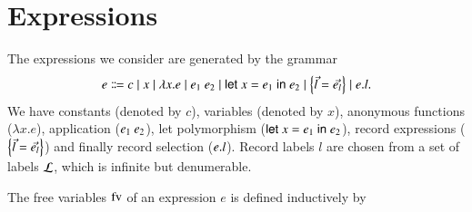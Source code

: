 \documentclass{report}
\begin{document}
  \section{Expressions}
  The expressions we consider are generated by the grammar
  \begin{displaymath}
    e \Coloneqq c
      \mid x
      \mid \lambda x.e
      \mid {e_1} \ {e_2}
      \mid \textsf{let } {x} = {e_1} \textsf{ in } {e_2}
      \mid \left\{\vec{l}=\vec{e_l}\right\}
      \mid {e}.{l}\textrm{.}
  \end{displaymath}
  We have constants (denoted by $c$), variables (denoted by
  $x$), anonymous functions ($\lambda x.e$), application (${e_1} \ {e_2}$),
  let polymorphism ($\textsf{let } {x} = {e_1} \textsf{ in } {e_2}$), record expressions ($\left\{\vec{l}=\vec{e_l}\right\}$)
  and finally record selection (${e}.{l}$). Record labels $l$
  are chosen from a set of labels $\mathcal{L}$, which is infinite but denumerable.
  \begin{dfn}
    The free variables $\mathop{\rm fv}\nolimits$ of an expression $e$ is defined inductively by
  \end{dfn}
  
\end{document}

